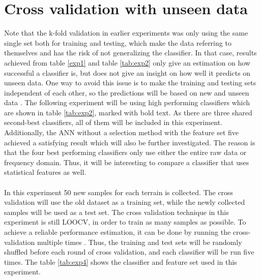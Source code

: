 \documentclass[USenglish]{ifimaster}  %
\begin{document}
\section{Cross validation with unseen data} \label{seq:crossunseen}
Note that the k-fold validation in earlier experiments was only using the same single set both for training and testing, which make the data referring to themselves and has the risk of not generalizing the classifier. In that case, results achieved from table \ref{exp1} and table \ref{tab:exp2} only give an estimation on how successful a classifier is, but does not give an insight on how well it predicts on unseen data. One way to avoid this issue is to make the training and testing sets independent of each other, so the predictions will be based on new and unseen data \cite{26b23e912c654fe4b7478fd910130195}. The following experiment will be using high performing classifiers which are shown in table \ref{tab:exp2}, marked with bold text. As there are three shared second-best classifiers, all of them will be included in this experiment. Additionally, the ANN without a selection method with the feature set five achieved a satisfying result which will also be further investigated. The reason is that the four best performing classifiers only use either the entire raw data or frequency domain. Thus, it will be interesting to compare a classifier that uses statistical features as well.
\\
\\
In this experiment 50 new samples for each terrain is collected. The cross validation will use the old dataset as a training set, while the newly collected samples will be used as a test set. The cross validation technique in this experiment is still LOOCV, in order to train as many samples as possible. To achieve a reliable performance estimation, it can be done by running the cross-validation multiple times \cite{Refaeilzadeh2009}. Thus, the training and test sets will be randomly shuffled before each round of cross validation, and each classifier will be run five times. The table \ref{tab:exp4} shows the classifier and feature set used in this experiment.
\end{document}
